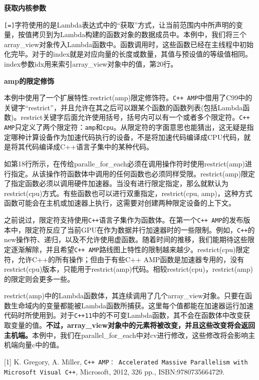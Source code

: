 \textbf{获取内核参数}

\texttt{[=]}字符使用的是Lambda表达式中的“获取”方式，让当前范围内中所声明的变量，按值拷贝到为Lambda构建的函数对象的数据成员中。本例中，我们将三个array\_\allowbreak{}view对象传入Lambda函数中。函数调用时，这些函数已经在主线程中初始化完毕。对于的index就是对应向量的长度或数量，其值与预设值的等级值相同。index参数idx用来索引array\_\allowbreak{}view对象中的值，第20行。

\textbf{amp的限定修饰}

本例中使用了一个扩展特性:restrict(amp)限定修饰符。\texttt{C++ AMP}中借用了C99中的关键字“restrict”，并且允许在其之后可以跟某个函数的函数列表(包括Lambda函数)。restrict关键字后面允许使用括号，括号内可以有一个或者多个限定符。\texttt{C++ AMP}只定义了两个限定符：\texttt{amp}和\texttt{cpu}。从限定符的字面意思也能猜出，这无疑是指定哪种计算设备作为加速代码执行的设备，不是将加速代码编译成CPU代码，就是将其代码编译成C++语言子集中的某种代码。

如第18行所示，在传给paralle\_\allowbreak{}for\_\allowbreak{}each必须在调用操作符时使用restrict(amp)进行指定。从该操作符函数体中调用的任何函数也必须同样受限。restrict(amp)限定了指定函数必须以调用硬件加速器。当没有进行限定指定，那么就默认为restrict(cpu)方式。有些函数也可以进行双重指定，restrict(cpu, amp)，这种方式函数可能会在主机或加速器上执行，这需要对创建两种限定设备的上下文。

之前说过，限定符支持使用\texttt{C++}语言子集作为函数体。在第一个\texttt{C++ AMP}的发布版本中，限定符反应了当前GPU在作为数据并行加速器时的一些限制。例如，\texttt{C++}的new操作符、递归，以及不允许使用虚函数。随着时间的推移，我们能期待这些限定逐渐解除，并且希望\texttt{C++ AMP}路线图上特性的限制越来越少。restrict(cpu)限定符，允许C++的所有操作；但由于有些C++ AMP函数是加速器专用的，没有restrict(cpu)版本，只能用于restrict(amp)代码。相较restrict(cpu)，restrict(amp)的限定则会更多一些。

restrict(amp)中的Lambda函数体，其连续调用了几个array\_\allowbreak{}view对象。只要在函数生命域内的变量都能被Lambda函数所捕获。这里每个值都能在加速器运行加速代码时所使用到。对于\texttt{C++11}中的不可变Lambda函数，其不会在函数体中改变获取变量的值。\textbf{不过，array\_\allowbreak{}view对象中的元素将被改变，并且这些改变将会返回主机端。}本例中，我们在parallel\_\allowbreak{}for\_\allowbreak{}each中对cv进行修改，这些修改将会影响主机端向量c中的值。

\myRefRule

\begin{myRefs}

[1] K. Gregory, A. Miller, \texttt{C++ AMP： Accelerated Massive Parallelism with Microsoft Visual C++}, Microsoft, 2012, 326 pp., ISBN:9780735664729.

\end{myRefs}



